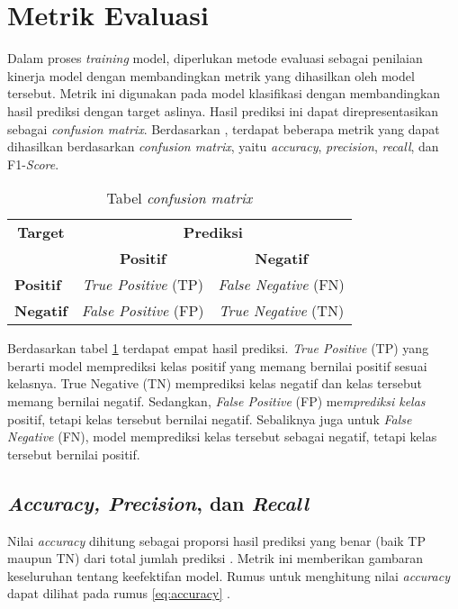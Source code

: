 \section{Metrik Evaluasi}

Dalam proses \textit{training} model, diperlukan metode evaluasi sebagai penilaian kinerja model dengan membandingkan metrik yang dihasilkan oleh model tersebut. Metrik ini digunakan pada model klasifikasi dengan membandingkan hasil prediksi dengan target aslinya. Hasil prediksi ini dapat direpresentasikan sebagai \textit{confusion matrix}. Berdasarkan \citeauthor{metrics}, terdapat beberapa metrik yang dapat dihasilkan berdasarkan \textit{confusion matrix}, yaitu \textit{accuracy}, \textit{precision}, \textit{recall}, dan F1-\textit{Score}.

\begin{table}[ht]
    \vspace{0.25cm}
    \centering
    \caption{Tabel \textit{confusion matrix} \parencite{metrics}}
    \label{table:confusion-matrix}
    \begin{tabular}{l|c|c}
        \toprule
        \multicolumn{1}{c|}{\textbf{Target}} & \multicolumn{2}{c}{\textbf{Prediksi}} \\
        & \textbf{Positif} & \textbf{Negatif} \\
        \midrule
        \textbf{Positif} & \textit{True Positive} (TP) & \textit{False Negative} (FN) \\
        \textbf{Negatif} & \textit{False Positive} (FP) & \textit{True Negative} (TN) \\
        \bottomrule
    \end{tabular}
\end{table}

Berdasarkan tabel \ref{table:confusion-matrix} terdapat empat hasil prediksi. \textit{True Positive} (TP) yang berarti model memprediksi kelas positif yang memang bernilai positif sesuai kelasnya. True Negative (TN) memprediksi kelas negatif dan kelas tersebut memang bernilai negatif. Sedangkan, \textit{False Positive} (FP) me\textit{mprediksi kelas} positif, tetapi kelas tersebut bernilai negatif. Sebaliknya juga untuk \textit{False Negative} (FN), model memprediksi kelas tersebut sebagai negatif, tetapi kelas tersebut bernilai positif.

\subsection{\textit{Accuracy, Precision}, dan \textit{Recall}}
Nilai \textit{accuracy} dihitung sebagai proporsi hasil prediksi yang benar (baik TP maupun TN) dari total jumlah prediksi \parencite{metrics}. Metrik ini memberikan gambaran keseluruhan tentang keefektifan model. Rumus untuk menghitung nilai \textit{accuracy} dapat dilihat pada rumus \ref{eq:accuracy} \parencite{metrics}.

